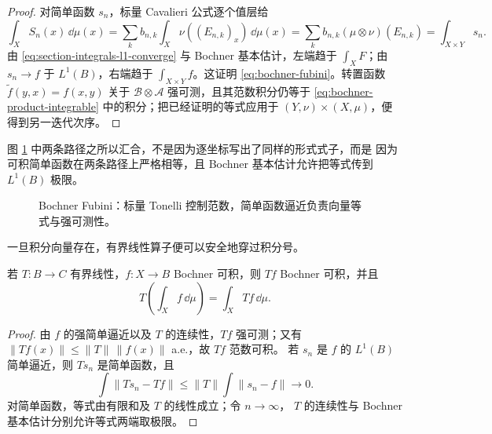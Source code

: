 \begin{proof}
对简单函数 $s_n$，标量 Cavalieri 公式逐个值层给
\[
 \int_XS_n(x)\,\dd\mu(x)
 =\sum_kb_{n,k}\int_X\nu((E_{n,k})_x)\,\dd\mu(x)
 =\sum_kb_{n,k}(\mu\otimes\nu)(E_{n,k})
 =\int_{X\times Y}s_n.
\]
由 \eqref{eq:section-integrals-l1-converge} 与 Bochner 基本估计，左端趋于 $\int_XF$；由
$s_n\to f$ 于 $L^1(B)$，右端趋于 $\int_{X\times Y}f$。这证明
\eqref{eq:bochner-fubini}。转置函数 $\widetilde f(y,x)=f(x,y)$ 关于
$\mathcal B\otimes\mathcal A$ 强可测，且其范数积分仍等于 \eqref{eq:bochner-product-integrable}
中的积分；把已经证明的等式应用于 $(Y,\nu)\times(X,\mu)$，便得到另一迭代次序。
\end{proof}

图 \ref{fig:3-4-3-bochner-fubini} 中两条路径之所以汇合，不是因为逐坐标写出了同样的形式式子，而是
因为可积简单函数在两条路径上严格相等，且 Bochner 基本估计允许把等式传到 $L^1(B)$ 极限。

\begin{figure}[htbp]
\centering
{}
\caption{Bochner Fubini：标量 Tonelli 控制范数，简单函数逼近负责向量等式与强可测性。}
\label{fig:3-4-3-bochner-fubini}
\end{figure}

一旦积分向量存在，有界线性算子便可以安全地穿过积分号。

\begin{proposition}[有界算子与积分交换]\label{proposition:3-4-3-2}
若 $T:B\to C$ 有界线性，$f:X\to B$ Bochner 可积，则 $Tf$ Bochner 可积，并且
\[
  T\!\left(\int_Xf\,\dd\mu\right)=\int_XTf\,\dd\mu.
\]
\end{proposition}

\begin{proof}
由 $f$ 的强简单逼近以及 $T$ 的连续性，$Tf$ 强可测；又有
$\|Tf(x)\|\le\|T\|\,\|f(x)\|$ a.e.，故 $Tf$ 范数可积。
若 $s_n$ 是 $f$ 的 $L^1(B)$ 简单逼近，则 $Ts_n$ 是简单函数，且
\[
 \int\|Ts_n-Tf\|\le\|T\|\int\|s_n-f\|\longrightarrow0.
\]
对简单函数，等式由有限和及 $T$ 的线性成立；令 $n\to\infty$，
$T$ 的连续性与 Bochner 基本估计分别允许等式两端取极限。
\end{proof}


